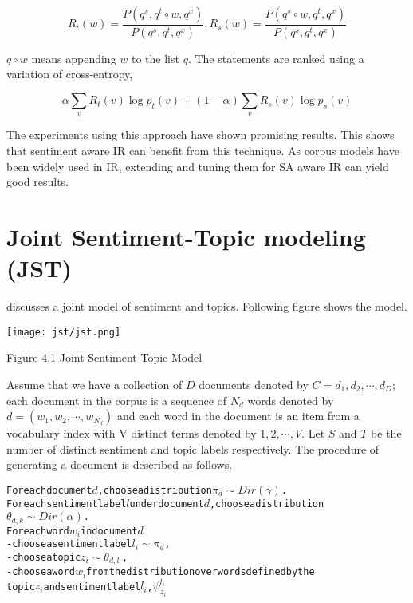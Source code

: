\begin{equation}
R_t(w) = \frac{P(q^s,q^t\circ w,q^x)}{P(q^s,q^t,q^x)} , R_s(w) = \frac{P(q^s \circ w,q^t,q^x)}{P(q^s,q^t,q^x)} 
\end{equation}

\(q \circ w\) means appending \(w\) to the list \(q\). The statements are ranked using a variation of cross-entropy,

\begin{equation}
 \alpha \sum_v R_t(v) \log p_t (v) + (1-\alpha) \sum_v R_s(v) \log p_s(v)
\end{equation}

\par

The experiments using this approach have shown promising results. This shows that sentiment aware IR can benefit from this technique.
As corpus models have been widely used in IR, extending and tuning them for SA aware IR can yield good results. 


\section{Joint Sentiment-Topic modeling (JST)}

\citep*{lin2009joint} discusses a joint model of sentiment and topics. Following figure shows the model.

\texttt{[image: jst/jst.png]} 
\begin{center}
 Figure 4.1 Joint Sentiment Topic Model
\end{center}

Assume that we have a collection of \(D\) documents denoted by \(C = {d_1,d_2,\cdots,d_D} \); each document in the corpus is a sequence
of \(N_d\) words denoted by \(d = (w_1,w_2,\cdots,w_{N_d}) \) and each word in the document is an item from a vocabulary index with V distinct
terms denoted by \({1,2,\cdots,V}\). Let \(S\) and \(T\) be the number of distinct sentiment and topic labels respectively. The procedure of
generating a document is described as follows.

\begin{alltt}
For each document \(d\), choose a distribution \(\pi_d \sim Dir(\gamma)\).
For each sentiment label \(l\) under document \(d\), choose a distribution
\(\theta_{d,k} \sim Dir(\alpha)\).
For each word \(w_i\) in document \(d\)
  - choose a sentiment label \(l_i \sim \pi_d\),
  - choose a topic \(z_i \sim \theta_{d,l_i}\),
  - choose a word \(w_i\) from the distribution over words defined by the 
    topic \(z_i\) and sentiment label \(l_i\), \(\psi_{z_i}^{l_i}\)
\end{alltt}


